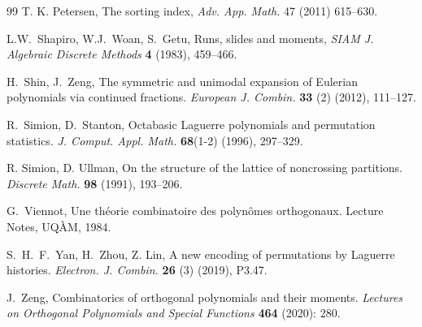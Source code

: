 \documentclass[12pt]{amsart}
\numberwithin{equation}{section}
\theoremstyle{plain}
\theoremstyle{definition}
\begin{document}
\begin{thebibliography}{99}
T. K. Petersen, The sorting index, {\it Adv. App. Math.} 47 (2011) 615--630.

L.W.~Shapiro, W.J.~Woan, S.~Getu, Runs, slides and moments, {\it SIAM J. Algebraic Discrete Methods} {\bf 4} (1983), 459--466.

H.~Shin, J.~Zeng, The symmetric and unimodal expansion of Eulerian polynomials via continued fractions. \textit{European J. Combin.} {\bf 33} (2) (2012), 111--127.





R.~Simion, D.~Stanton, Octabasic Laguerre polynomials and permutation statistics. {\it J. Comput. Appl. Math.} {\bf 68}(1-2) (1996), 297--329.

R. Simion, D. Ullman, On the structure of the lattice of noncrossing partitions. {\it Discrete Math.}
 {\bf98} (1991), 193--206.




G.~Viennot, Une th\'eorie combinatoire des polyn\^omes orthogonaux. Lecture Notes, UQ\`AM, 1984.




S.~H.~F.~Yan, H.~Zhou, Z. Lin, A new encoding of permutations by Laguerre histories. {\it Electron. J. Combin. } {\bf26} (3) (2019), P3.47.

J.~Zeng, Combinatorics of orthogonal polynomials and their moments. {\it Lectures on Orthogonal Polynomials and Special Functions} {\bf 464} (2020): 280.


\end{thebibliography}
\end{document}
